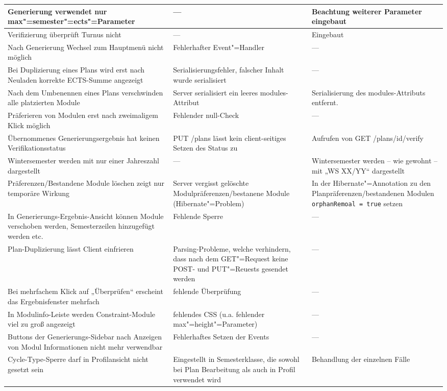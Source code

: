 \begin{longtable}{| >{\hspace{0pt}} p{} | >{\hspace{0pt}} p{} | >{\hspace{0pt}} p{} | }
	\hline
	Generierung verwendet nur max"=semester"=ects"=Parameter & --- & Beachtung weiterer Parameter eingebaut \\
	\hline
	Verifizierung überprüft Turnus nicht & --- & Eingebaut \\
	\hline
	Nach Generierung Wechsel zum Hauptmenü nicht möglich & Fehlerhafter Event"=Handler & --- \\
	\hline
	Bei Duplizierung eines Plans wird erst nach Neuladen korrekte ECTS-Summe angezeigt & Serialisierungsfehler, falscher Inhalt wurde serialisiert & --- \\
	\hline
	Nach dem Umbenennen eines Plans verschwinden alle platzierten Module & Server serialisiert ein leeres modules-Attribut & Serialisierung des modules-Attributs entfernt. \\
	\hline
	Präferieren von Modulen erst nach zweimaligem Klick möglich & Fehlender null-Check & --- \\
	\hline
	Übernommenes Generierungsergebnis hat keinen Verifikationsstatus & PUT /plans lässt kein client-seitiges Setzen des Status zu & Aufrufen von GET /plans/id/verify \\
	\hline
	Wintersemester werden mit nur einer Jahreszahl dargestellt & --- & Wintersemester werden – wie gewohnt – mit „WS XX/YY“ dargestellt \\
	\hline
	Präferenzen/Bestandene Module löschen zeigt nur temporäre Wirkung & Server vergisst gelöschte Modulpräferenzen/bestanene Module (Hibernate"=Problem) & In der Hibernate"=Annotation zu den Planpräferenzen/bestandenen Modulen \texttt{orphanRemoal = true} setzen \\
	\hline
	In Generierungs-Ergebnis-Ansicht können Module verschoben werden, Semesterzeilen hinzugefügt werden etc. & Fehlende Sperre & --- \\
	\hline
	Plan-Duplizierung lässt Client einfrieren & Parsing-Probleme, welche verhindern, dass nach dem GET"=Request keine POST- und PUT"=Reuests gesendet werden & --- \\
	\hline
	Bei mehrfachem Klick auf „Überprüfen“ erscheint das Ergebnisfenster mehrfach & fehlende Überprüfung & --- \\
	\hline
	In Modulinfo-Leiste werden Constraint-Module viel zu groß angezeigt & fehlendes CSS (u.a. fehlender max"=height"=Parameter) & --- \\
	\hline
	Buttons der Generierungs-Sidebar nach Anzeigen von Modul Informationen nicht mehr verwendbar & Fehlerhaftes Setzen der Events & --- \\
	\hline
	Cycle-Type-Sperre darf in Profilansicht nicht gesetzt sein & Eingestellt in Semesterklasse, die sowohl bei Plan Bearbeitung als auch in Profil verwendet wird & Behandlung der einzelnen Fälle \\

\end{longtable}
